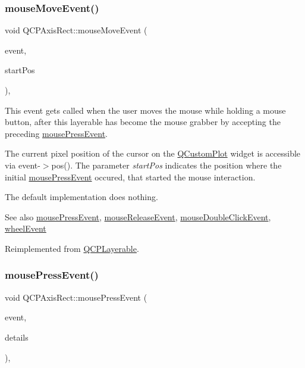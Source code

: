 \subsubsection{\texorpdfstring{mouseMoveEvent()}{mouseMoveEvent()}}
{\footnotesize\ttfamily void Q\+C\+P\+Axis\+Rect\+::mouse\+Move\+Event (\begin{DoxyParamCaption}\item[{Q\+Mouse\+Event $\ast$}]{event,  }\item[{const Q\+PointF \&}]{start\+Pos }\end{DoxyParamCaption})\hspace{0.3cm}{\ttfamily [protected]}, {\ttfamily [virtual]}}

This event gets called when the user moves the mouse while holding a mouse button, after this layerable has become the mouse grabber by accepting the preceding \mbox{\hyperlink{class_q_c_p_axis_rect_aa9a7c807eaa4666870ac94aa6abc4dde}{mouse\+Press\+Event}}.

The current pixel position of the cursor on the \mbox{\hyperlink{class_q_custom_plot}{Q\+Custom\+Plot}} widget is accessible via {\ttfamily event-\/$>$pos()}. The parameter {\itshape start\+Pos} indicates the position where the initial \mbox{\hyperlink{class_q_c_p_axis_rect_aa9a7c807eaa4666870ac94aa6abc4dde}{mouse\+Press\+Event}} occured, that started the mouse interaction.

The default implementation does nothing.

\begin{DoxySeeAlso}{See also}
\mbox{\hyperlink{class_q_c_p_axis_rect_aa9a7c807eaa4666870ac94aa6abc4dde}{mouse\+Press\+Event}}, \mbox{\hyperlink{class_q_c_p_axis_rect_a6c89b988d3a0b93c0878f0ebdb5037f4}{mouse\+Release\+Event}}, \mbox{\hyperlink{class_q_c_p_layerable_a4171e2e823aca242dd0279f00ed2de81}{mouse\+Double\+Click\+Event}}, \mbox{\hyperlink{class_q_c_p_axis_rect_a93eeaa0c127d6d6fe8171b2455080262}{wheel\+Event}} 
\end{DoxySeeAlso}


Reimplemented from \mbox{\hyperlink{class_q_c_p_layerable_a9eee1ba47fd69be111059ca3881933e4}{Q\+C\+P\+Layerable}}.

\mbox{\label{class_q_c_p_axis_rect_aa9a7c807eaa4666870ac94aa6abc4dde}} 
\subsubsection{\texorpdfstring{mousePressEvent()}{mousePressEvent()}}
{\footnotesize\ttfamily void Q\+C\+P\+Axis\+Rect\+::mouse\+Press\+Event (\begin{DoxyParamCaption}\item[{Q\+Mouse\+Event $\ast$}]{event,  }\item[{const Q\+Variant \&}]{details }\end{DoxyParamCaption})\hspace{0.3cm}{\ttfamily [protected]}, {\ttfamily [virtual]}}

